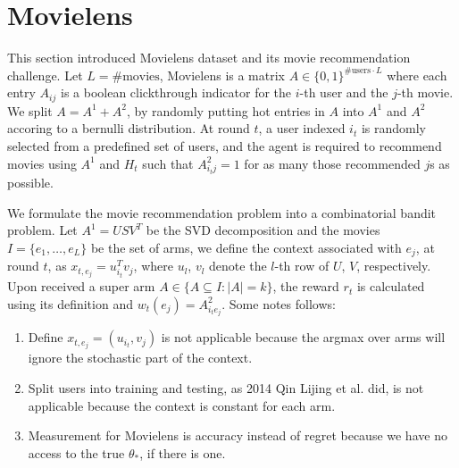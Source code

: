 \documentclass[a4paper,11pt]{article}
\begin{document}
\section{Movielens}

This section introduced Movielens dataset and its movie recommendation challenge. Let $L=\#\text{movies}$, Movielens is a matrix $A\in \{0,1\}^{\#\text{users}\cdot L}$ where each entry $A_{ij}$ is a boolean clickthrough indicator for the $i$-th user and the $j$-th movie. We split $A=A^1+A^2$, by randomly putting hot entries in $A$ into $A^1$ and $A^2$ accoring to a bernulli distribution. At round $t$, a user indexed $i_t$ is randomly selected from a predefined set of users, and the agent is required to recommend movies using $A^1$ and $H_t$ such that $A^2_{i_tj}=1$ for as many those recommended $j$s as possible.

We formulate the movie recommendation problem into a combinatorial bandit problem. Let $A^1=USV^T$ be the SVD decomposition and the movies $I=\{e_1,\dots,e_L\}$ be the set of arms, we define the context associated with $e_j$, at round $t$, as $x_{t,e_j}=u_{i_t}^Tv_j$, where $u_l$, $v_l$ denote the $l$-th row of $U$, $V$, respectively. Upon received a super arm $A\in \{A\subseteq I: |A|=k\}$, the reward $r_t$ is calculated using its definition and $w_t(e_j)=A^2_{i_te_j}$. Some notes follows:

\begin{enumerate}

  \item Define $x_{t,e_j}=(u_{i_t}, v_j)$ is not applicable because the argmax over arms will ignore the stochastic part of the context.

  \item Split users into training and testing, as 2014 Qin Lijing et al. did, is not applicable because the context is constant for each arm.

  \item Measurement for Movielens is accuracy instead of regret because we have no access to the true $\theta_\ast$, if there is one.

\end{enumerate}
\end{document}

